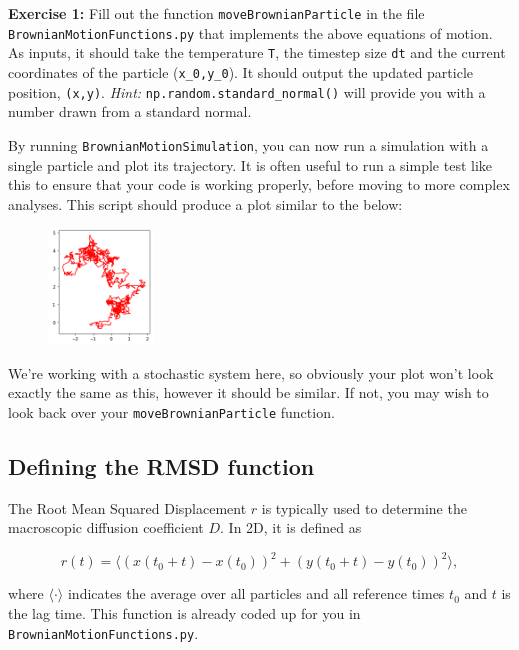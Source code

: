 \documentclass[11pt, oneside]{article}
\begin{document}
 	\textbf{Exercise 1:} Fill out the function \texttt{moveBrownianParticle} in the file \texttt{BrownianMotionFunctions.py} that implements the above equations of motion. As inputs, it should take the temperature \texttt{T}, the timestep size \texttt{dt} and the current coordinates of the particle (\texttt{x\_0,y\_0}). It should output the updated particle position, \texttt{(x,y)}. \textit{Hint:} \texttt{np.random.standard\_normal()} will provide you with a number drawn from a standard normal.
 	
 	\bigskip
 	
 	By running \texttt{BrownianMotionSimulation}, you can now run a simulation with a single particle and plot its trajectory. It is often useful to run a simple test like this to ensure that your code is working properly, before moving to more complex analyses. This script should produce a plot similar to the below:
	
	\begin{figure}[h]
		\centering
		\includegraphics[width = 0.25\textwidth, clip = false]{Figs/SingleBPplot.PNG}
	\end{figure}
	
	We're working with a stochastic system here, so obviously your plot won't look exactly the same as this, however it should be similar. If not, you may wish to look back over your \texttt{moveBrownianParticle} function.
	
	\subsection{Defining the RMSD function}
	
	The Root Mean Squared Displacement $r$ is typically used to determine the macroscopic diffusion coefficient $D$. In 2D, it is defined as
	
	\begin{equation}
		r(t) = \langle(x(t_0 + t)-x(t_0))^2 + (y(t_0 + t)-y(t_0))^2\rangle,
	\end{equation}
	
	where $\langle \cdot \rangle$ indicates the average over all particles and all reference times $t_0$ and $t$ is the lag time. This function is already coded up for you in \texttt{BrownianMotionFunctions.py}.
	
\end{document}
